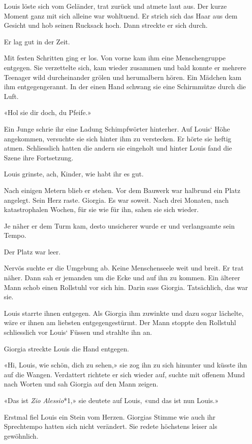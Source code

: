 Louis löste sich vom Geländer, trat zurück und atmete laut aus. Der
kurze Moment ganz mit sich alleine war wohltuend. Er strich sich das
Haar aus dem Gesicht und hob seinen Rucksack hoch. Dann streckte er sich
durch.

Er lag gut in der Zeit.

Mit festen Schritten ging er los. Von vorne kam ihm eine Menschengruppe
entgegen. Sie verzettelte sich, kam wieder zusammen und bald konnte er
mehrere Teenager wild durcheinander grölen und herumalbern hören. Ein
Mädchen kam ihm entgegengerannt. In der einen Hand schwang sie eine
Schirmmütze durch die Luft.

«Hol sie dir doch, du Pfeife.»

Ein Junge schrie ihr eine Ladung Schimpfwörter hinterher. Auf Louis`
Höhe angekommen, versuchte sie sich hinter ihm zu verstecken. Er hörte
sie heftig atmen. Schliesslich hatten die andern sie eingeholt und
hinter Louis fand die Szene ihre Fortsetzung.

Louis grinste, ach, Kinder, wie habt ihr es gut.

Nach einigen Metern blieb er stehen. Vor dem Bauwerk war halbrund ein
Platz angelegt. Sein Herz raste. Giorgia. Es war soweit. Nach drei
Monaten, nach katastrophalen Wochen, für sie wie für ihn, sahen sie sich
wieder.

Je näher er dem Turm kam, desto unsicherer wurde er und verlangsamte
sein Tempo.

Der Platz war leer.

Nervös suchte er die Umgebung ab. Keine Menschenseele weit und breit. Er
trat näher. Dann sah er jemanden um die Ecke und auf ihn zu kommen. Ein
älterer Mann schob einen Rollstuhl vor sich hin. Darin sass Giorgia.
Tatsächlich, das war sie.

Louis starrte ihnen entgegen. Als Giorgia ihm zuwinkte und dazu sogar
lächelte, wäre er ihnen am liebsten entgegengestürmt. Der Mann stoppte
den Rollstuhl schliesslich vor Louis` Füssen und strahlte ihn an.

Giorgia streckte Louis die Hand entgegen.

«Hi, Louis, wie schön, dich zu sehen,» sie zog ihn zu sich hinunter und
küsste ihn auf die Wangen. Verdattert richtete er sich wieder auf,
suchte mit offenem Mund nach Worten und sah Giorgia auf den Mann zeigen.

«Das ist \emph{Zio Alessio}*1,» sie deutete auf Louis, «und das ist nun
Louis.»

Erstmal fiel Louis ein Stein vom Herzen. Giorgias Stimme wie auch ihr
Sprechtempo hatten sich nicht verändert. Sie redete höchstens leiser als
gewöhnlich.

